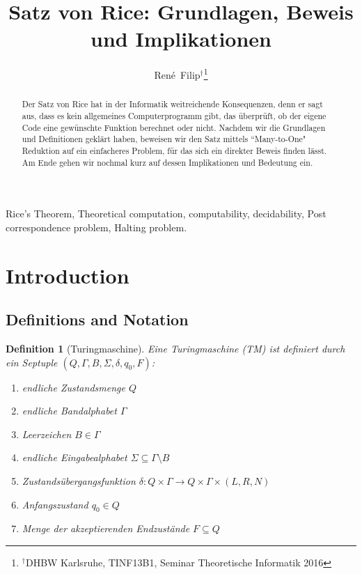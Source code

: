 \documentclass[journal]{IEEEtran}
\begin{document}
\newtheorem{definition}{Definition}

\title{Satz von Rice: Grundlagen, Beweis und Implikationen}


\author{René~Filip$^{\dag}$\thanks{$^{\dag}$DHBW Karlsruhe, TINF13B1, Seminar Theoretische Informatik 2016}}


\maketitle


\begin{abstract}
Der Satz von Rice hat in der Informatik weitreichende Konsequenzen, denn er sagt aus, dass es kein allgemeines Computerprogramm gibt, das überprüft, ob der eigene Code eine gewünschte Funktion berechnet oder nicht. Nachdem wir die Grundlagen und Definitionen geklärt haben, beweisen wir den Satz mittels ``Many-to-One" Reduktion auf ein einfacheres Problem, für das sich ein direkter Beweis finden lässt. Am Ende gehen wir nochmal kurz auf dessen Implikationen und Bedeutung ein.
\end{abstract}


\begin{IEEEkeywords}
Rice's Theorem, Theoretical computation, computability, decidability, Post correspondence problem, Halting problem.
\end{IEEEkeywords}



\section{Introduction}



\subsection{Definitions and Notation}

\begin{definition}[Turingmaschine]
  Eine Turingmaschine (TM) ist definiert durch ein Septuple $(Q, \Gamma, B, \Sigma, \delta, q_0, F)$:
  \begin{enumerate}
    \item endliche Zustandsmenge $Q$
    \item endliche Bandalphabet $\Gamma$
    \item Leerzeichen $B \in \Gamma$
    \item endliche Eingabealphabet $\Sigma \subseteq \Gamma \setminus B$
    \item Zustandsübergangsfunktion $\delta \colon Q \times \Gamma \to Q \times \Gamma \times (L, R, N)$
    \item Anfangszustand $q_0 \in Q$
    \item Menge der akzeptierenden Endzustände $F \subseteq Q$
  \end{enumerate}
\end{definition}
\end{document}
